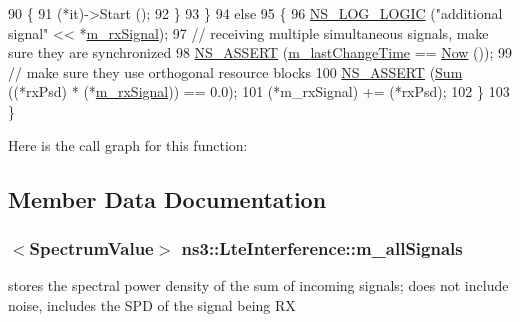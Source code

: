 \begin{DoxyCode}
90         \{
91           (*it)->Start (); 
92         \}
93     \}
94   \textcolor{keywordflow}{else}
95     \{
96       \hyperlink{group__logging_ga88acd260151caf2db9c0fc84997f45ce}{NS\_LOG\_LOGIC} (\textcolor{stringliteral}{"additional signal"} << *\hyperlink{classns3_1_1LteInterference_a110c40dd295d66897ca93e4bcc947dfa}{m\_rxSignal});
97       \textcolor{comment}{// receiving multiple simultaneous signals, make sure they are synchronized}
98       \hyperlink{assert_8h_a6dccdb0de9b252f60088ce281c49d052}{NS\_ASSERT} (\hyperlink{classns3_1_1LteInterference_ab694cd3b025f150e39b071e0f3d294a7}{m\_lastChangeTime} == \hyperlink{group__simulator_gac3635e2e87f7ce316c89290ee1b01d0d}{Now} ());
99       \textcolor{comment}{// make sure they use orthogonal resource blocks}
100       \hyperlink{assert_8h_a6dccdb0de9b252f60088ce281c49d052}{NS\_ASSERT} (\hyperlink{namespacens3_afad5475661952172fe6ef1260360dad8}{Sum} ((*rxPsd) * (*\hyperlink{classns3_1_1LteInterference_a110c40dd295d66897ca93e4bcc947dfa}{m\_rxSignal})) == 0.0);
101       (*m\_rxSignal) += (*rxPsd);
102     \}
103 \}
\end{DoxyCode}


Here is the call graph for this function\+:




\subsection{Member Data Documentation}
\subsubsection[{\texorpdfstring{m\+\_\+all\+Signals}{m_allSignals}}]{$<${\bf Spectrum\+Value}$>$ ns3\+::\+Lte\+Interference\+::m\+\_\+all\+Signals\hspace{0.3cm}{\ttfamily [private]}}\hypertarget{classns3_1_1LteInterference_a40f11c0e16be1fe4ee232f5c4620c24e}{}\label{classns3_1_1LteInterference_a40f11c0e16be1fe4ee232f5c4620c24e}
stores the spectral power density of the sum of incoming signals; does not include noise, includes the S\+PD of the signal being RX 
